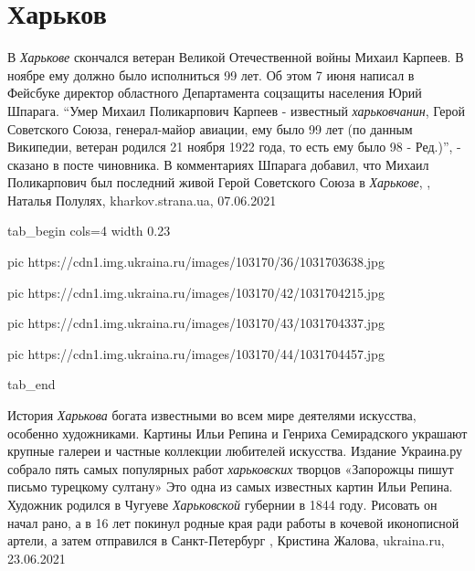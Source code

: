  
 
 
 
 
\chapter{Харьков}
\label{sec:slova.harkov}

В \emph{Харькове} скончался ветеран Великой Отечественной войны Михаил Карпеев. В
ноябре ему должно было исполниться 99 лет. Об этом 7 июня написал в Фейсбуке
директор областного Департамента соцзащиты населения Юрий Шпарага.  \enquote{Умер
Михаил Поликарпович Карпеев - известный \emph{харьковчанин}, Герой Советского Союза,
генерал-майор авиации, ему было 99 лет (по данным Википедии, ветеран родился 21
ноября 1922 года, то есть ему было 98 - Ред.)}, - сказано в посте чиновника.  В
комментариях Шпарага добавил, что Михаил Поликарпович был последний живой Герой
Советского Союза в \emph{Харькове},
, Наталья Полулях, kharkov.strana.ua, 07.06.2021


\ifcmt
  tab_begin cols=4
		width 0.23

     pic https://cdn1.img.ukraina.ru/images/103170/36/1031703638.jpg

     pic https://cdn1.img.ukraina.ru/images/103170/42/1031704215.jpg

		 pic https://cdn1.img.ukraina.ru/images/103170/43/1031704337.jpg

		 pic https://cdn1.img.ukraina.ru/images/103170/44/1031704457.jpg

  tab_end
\fi

История \emph{Харькова} богата известными во всем мире деятелями искусства, особенно
художниками. Картины Ильи Репина и Генриха Семирадского украшают крупные
галереи и частные коллекции любителей искусства. Издание Украина.ру собрало
пять самых популярных работ \emph{харьковских} творцов «Запорожцы пишут письмо
турецкому султану» Это одна из самых известных картин Ильи Репина.  Художник
родился в Чугуеве \emph{Харьковской} губернии в 1844 году. Рисовать он начал рано, а в
16 лет покинул родные края ради работы в кочевой иконописной артели, а затем
отправился в Санкт-Петербург
, 
Кристина Жалова, ukraina.ru, 23.06.2021

